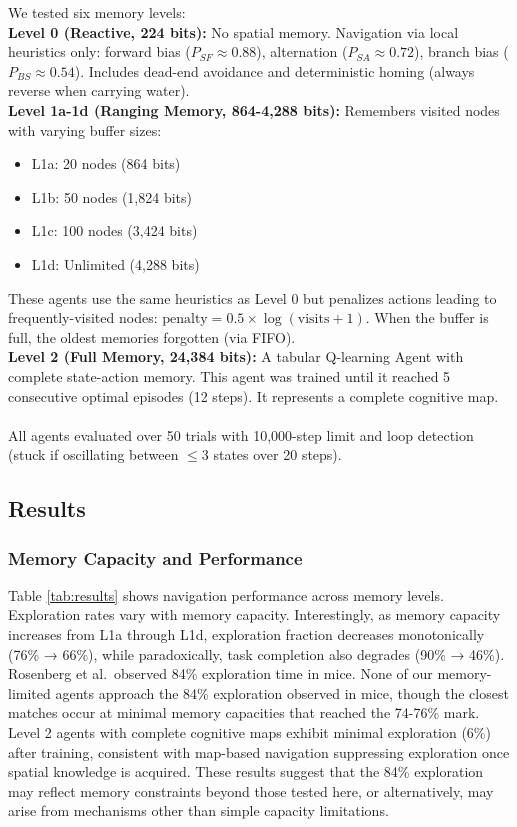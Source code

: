 We tested six memory levels:\\
\textbf{Level 0 (Reactive, 224 bits):} No spatial memory. Navigation via local heuristics only: forward bias ($P_{SF} \approx 0.88$), alternation ($P_{SA} \approx 0.72$), branch bias ($P_{BS} \approx 0.54$). Includes dead-end avoidance and deterministic homing (always reverse when carrying water).\\
\textbf{Level 1a-1d (Ranging Memory, 864-4,288 bits):} Remembers visited nodes with varying buffer sizes:
\begin{itemize}
    \item L1a: 20 nodes (864 bits)
    \item L1b: 50 nodes (1,824 bits)
    \item L1c: 100 nodes (3,424 bits)
    \item L1d: Unlimited (4,288 bits)
\end{itemize}
These agents use the same heuristics as Level 0 but penalizes actions leading to frequently-visited nodes: $\text{penalty} = 0.5 \times \log(\text{visits} + 1)$. When the buffer is full, the oldest memories forgotten (via FIFO).\\
\textbf{Level 2 (Full Memory, 24,384 bits):} A tabular Q-learning Agent \cite{watkins1992} with complete state-action memory. This agent was trained until it reached 5 consecutive optimal episodes (12 steps). It represents a complete cognitive map.\\ \\
All agents evaluated over 50 trials with 10,000-step limit and loop detection (stuck if oscillating between $\leq 3$ states over 20 steps).

\subsection{Results}

\subsubsection{Memory Capacity and Performance}

Table \ref{tab:results} shows navigation performance across memory levels. Exploration rates vary with memory capacity. Interestingly, as memory capacity increases from L1a through L1d, exploration fraction decreases monotonically (76\% → 66\%), while paradoxically, task completion also degrades (90\% → 46\%). Rosenberg et al.\ observed 84\% exploration time in mice. None of our memory-limited agents approach the 84\% exploration observed in mice, though the closest matches occur at minimal memory capacities that reached the 74-76\% mark. Level 2 agents with complete cognitive maps exhibit minimal exploration (6\%) after training, consistent with map-based navigation suppressing exploration once spatial knowledge is acquired. These results suggest that the 84\% exploration may reflect memory constraints beyond those tested here, or alternatively, may arise from mechanisms other than simple capacity limitations.

